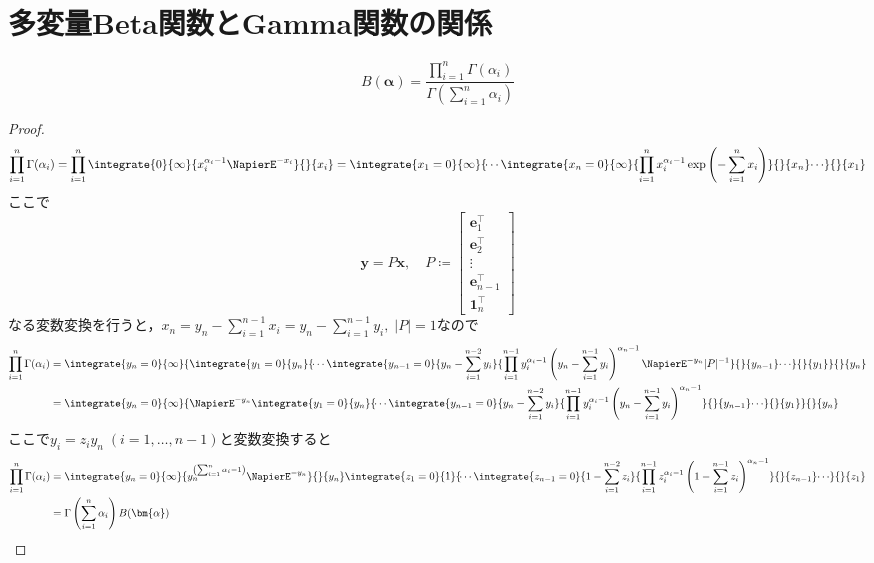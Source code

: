     \section{多変量Beta関数とGamma関数の関係}
        \begin{shadebox}
            \[B(\bm{\alpha}) = \frac{\prod_{i=1}^n\Gamma(\alpha_i)}{\Gamma(\sum_{i=1}^n \alpha_i)}\]
        \end{shadebox}
        \begin{proof}
            \[ \prod_{i=1}^n \Gamma(\alpha_i) = \prod_{i=1}^n \integrate{0}{\infty}{x_i^{\alpha_i-1}\NapierE^{-x_i}}{}{x_i} = \integrate{x_1=0}{\infty}{\dotsi\integrate{x_n=0}{\infty}{\prod_{i=1}^n x_i^{\alpha_i-1}\exp\left(-\sum_{i=1}^n x_i\right)}{}{x_n}\dotsi}{}{x_1} \]
            ここで
            \[
                \bm{y} = P\bm{x},\quad
                P \coloneq
                \begin{bmatrix}
                    \bm{e}_1^\top \\
                    \bm{e}_2^\top \\
                    \vdots \\
                    \bm{e}_{n-1}^\top \\
                    \bm{1}_n^\top
                \end{bmatrix}
            \]
            なる変数変換を行うと，$x_n = y_n - \sum_{i=1}^{n-1}x_i = y_n - \sum_{i=1}^{n-1}y_i,\;|P|=1$なので
            \begin{align*}
                \prod_{i=1}^n \Gamma(\alpha_i) &= \integrate{y_n=0}{\infty}{\integrate{y_1=0}{y_n}{\dotsi\integrate{y_{n-1}=0}{y_n-\sum_{i=1}^{n-2}y_i}{\prod_{i=1}^{n-1}y_i^{\alpha_i-1}\left(y_n-\sum_{i=1}^{n-1} y_i \right)^{\alpha_n-1} \NapierE^{-y_n}|P|^{-1}}{}{y_{n-1}}\dotsi}{}{y_1}}{}{y_n} \\
                &= \integrate{y_n=0}{\infty}{\NapierE^{-y_n}\integrate{y_1=0}{y_n}{\dotsi\integrate{y_{n-1}=0}{y_n-\sum_{i=1}^{n-2}y_i}{\prod_{i=1}^{n-1}y_i^{\alpha_i-1}\left(y_n-\sum_{i=1}^{n-1} y_i \right)^{\alpha_n-1}}{}{y_{n-1}}\dotsi}{}{y_1}}{}{y_n}
            \end{align*}
            ここで$y_i = z_iy_n\;(i=1,\dotsc,n-1)$と変数変換すると
            \begin{align*}
                \prod_{i=1}^n \Gamma(\alpha_i) &= \integrate{y_n=0}{\infty}{y_n^{\left(\sum_{i=1}^n \alpha_i-1\right)}\NapierE^{-y_n}}{}{y_n}\integrate{z_1=0}{1}{\dotsi\integrate{z_{n-1}=0}{1-\sum_{i=1}^{n-2}z_i}{\prod_{i=1}^{n-1}z_i^{\alpha_i-1}\left(1-\sum_{i=1}^{n-1} z_i \right)^{\alpha_n-1}}{}{z_{n-1}}\dotsi}{}{z_1} \\
                &= \Gamma\left(\sum_{i=1}^n \alpha_i\right)B(\bm{\alpha})
            \end{align*}
        \end{proof}